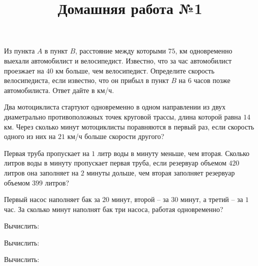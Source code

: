 \newpage
\title{Домашняя работа №1}
\begin{listofex}
	\item Из пункта \( A \) в пункт \( B \), расстояние между которыми \(75\), км одновременно выехали автомобилист и велосипедист. Известно, что за час автомобилист проезжает на \(40\) км больше, чем велосипедист. Определите скорость велосипедиста, если известно, что он прибыл в пункт \(B\) на \(6\) часов позже автомобилиста. Ответ дайте в км/ч.
	\item Два мотоциклиста стартуют одновременно в одном направлении из двух диаметрально противоположных точек круговой трассы, длина которой равна \( 14  \) км. Через сколько минут мотоциклисты поравняются в первый раз, если скорость одного из них на \( 21  \) км/ч больше скорости другого?
	\item Первая труба пропускает на \(1\) литр воды в минуту меньше, чем вторая. Сколько литров воды в минуту пропускает первая труба, если резервуар объемом \(420\) литров она заполняет на \( 2 \) минуты дольше, чем вторая заполняет резервуар объемом \(399\) литров?
	\item Первый насос наполняет бак за \( 20 \) минут, второй – за \( 30 \) минут, а третий – за \( 1 \) час. За сколько минут наполнят бак три насоса, работая одновременно?
	\item Вычислить:
	\begin{enumcols}[itemcolumns=4]
		\item {}
		\item {}
		\item {}
		\item {}
		\item {}
		\item {}
		\item {}
		\item {}
	\end{enumcols}
	\item Вычислить:
	\begin{enumcols}[itemcolumns=2]
		\item {}
		\item {}
		\item {}
		\item {}
	\end{enumcols}
	\item Вычислить:
	\begin{enumcols}[itemcolumns=2]
		\item {}

\end{enumcols}
\end{listofex}
